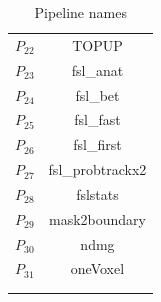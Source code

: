 \documentclass[conference]{IEEEtran}
\begin{document}
\begin{table}
\begin{tabular}{cc}
        $P_{22}$ & TOPUP	\\
        $P_{23}$ & fsl\_anat	\\
        $P_{24}$ & fsl\_bet	\\
        $P_{25}$ & fsl\_fast	\\
        $P_{26}$ & fsl\_first	\\
        $P_{27}$ & fsl\_probtrackx2	\\
        $P_{28}$ & fslstats	\\
        $P_{29}$ &mask2boundary\\
        $P_{30}$ & ndmg	\\
        $P_{31}$ & oneVoxel\\
        \hline\\
        &
    \end{tabular}
    \caption{Pipeline names}
    \label{tab:pipeline_names}
\end{table}


\end{document}
